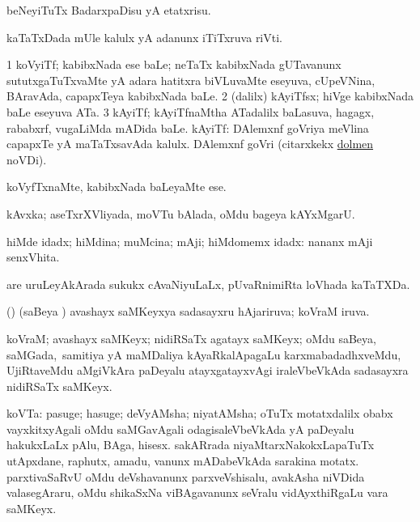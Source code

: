 \bentry
{}
\gl{\sakirx}
\expl{}
\bmng
beNeyiTuTx BadarxpaDisu yA etatxrisu. 
\emng
\eentry

\bentry
{}
\gl{\nA}
\bmng
kaTaTxDada mUle kalulx yA adanunx iTiTxruva riVti. 
\emng
\eentry

\bentry
{}
\gl{\nA}
\bmng
\bnum
\num{1} koVyiTf; kabibxNada ese baLe; neTaTx kabibxNada gUTavanunx sututxgaTuTxvaMte yA adara hatitxra biVLuvaMte eseyuva, cUpeVNina, BAravAda, capapxTeya kabibxNada baLe. 
\num{2} (\bava dalilx) kAyiTfsx; hiVge kabibxNada baLe eseyuva ATa. 
\num{3} kAyiTf; kAyiTfnaMtha ATadalilx baLasuva, hagagx, rababxrf, \mo vugaLiMda mADida baLe. 
 kAyiTf: 
\banum
{} DAlemxnf goVriya meVlina capapxTe yA maTaTxsavAda kalulx. 
 DAlemxnf goVri (citarxkekx \hyperref{kandict_d.pdf}{D}{dolmen}{dolmen} noVDi). 
\eanum
\numie
\enum
\emng
\eentry

\bentry
{}
\gl{\sakirx}
\bmng
koVyfTxnaMte, kabibxNada baLeyaMte ese. 
\emng
\eentry

\bentry
{}
\gl{\nA}
\bmng
kAvxka; aseTxrXVliyada, moVTu bAlada, oMdu bageya kAYxMgarU. 
\emng
\eentry

\bentry
{}
\gl{\gu}
\bmng
hiMde idadx; hiMdina; muMcina; mAji; hiMdomemx idadx:  nananx mAji senxVhita. 
\emng
\eentry

\bentry
{}
\gl{\nA}
\expl{(\ame) \P\ }
\bmng
are uruLeyAkArada sukukx cAvaNiyuLaLx, pUvaRnimiRta loVhada kaTaTXDa. 
\emng
\eentry

\bentry
{}
\gl{\gu}
\bmng
(\birx) (saBeya \vi) avashayx saMKeyxya sadasayxru hAjariruva; koVraM iruva. 
\emng
\eentry

\bentry
{}
\gl{\nA}
\bmng
koVraM; avashayx saMKeyx; nidiRSaTx agatayx saMKeyx; oMdu saBeya, \hbox{saMGada, samitiya} yA maMDaliya kAyaRkalApagaLu karxmabadadhxveMdu, UjiRtaveMdu aMgiVkAra paDeyalu atayxgatayxvAgi iraleVbeVkAda sadasayxra nidiRSaTx saMKeyx. 
\emng
\eentry

\bentry
{}
\gl{\nA}
\expl{}
\bmng
koVTa: 
\banum
{} pasuge; hasuge; deVyAMsha; niyatAMsha; oTuTx motatxdalilx obabx vayxkitxyAgali oMdu saMGavAgali odagisaleVbeVkAda yA paDeyalu hakukxLaLx pAlu, BAga, hisesx. 
 sakARrada niyaMtarxNakokxLapaTuTx utApxdane, raphutx, amadu, \mo vanunx mADabeVkAda sarakina motatx. 
 parxtivaSaRvU oMdu deVshavanunx parxveVshisalu, avakAsha niVDida valasegAraru, oMdu shikaSxNa viBAgavanunx seVralu vidAyxthiRgaLu \mo vara saMKeyx. 
\eanum
\emng
\eentry

